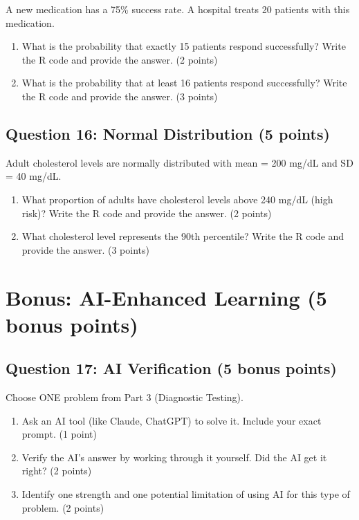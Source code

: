 \documentclass[11pt]{article}
\begin{document}
A new medication has a 75\% success rate. A hospital treats 20 patients with this medication.

\begin{enumerate}[label=\alph*)]
\item What is the probability that exactly 15 patients respond successfully? Write the R code and provide the answer. (2 points)
\item What is the probability that at least 16 patients respond successfully? Write the R code and provide the answer. (3 points)
\end{enumerate}

\vspace{1.5cm}

\subsection*{Question 16: Normal Distribution (5 points)}

Adult cholesterol levels are normally distributed with mean = 200 mg/dL and SD = 40 mg/dL.

\begin{enumerate}[label=\alph*)]
\item What proportion of adults have cholesterol levels above 240 mg/dL (high risk)? Write the R code and provide the answer. (2 points)
\item What cholesterol level represents the 90th percentile? Write the R code and provide the answer. (3 points)
\end{enumerate}

\vspace{1.5cm}

\section*{Bonus: AI-Enhanced Learning (5 bonus points)}

\subsection*{Question 17: AI Verification (5 bonus points)}

Choose ONE problem from Part 3 (Diagnostic Testing).

\begin{enumerate}[label=\alph*)]
\item Ask an AI tool (like Claude, ChatGPT) to solve it. Include your exact prompt. (1 point)
\item Verify the AI's answer by working through it yourself. Did the AI get it right? (2 points)
\item Identify one strength and one potential limitation of using AI for this type of problem. (2 points)
\end{enumerate}
\end{document}

